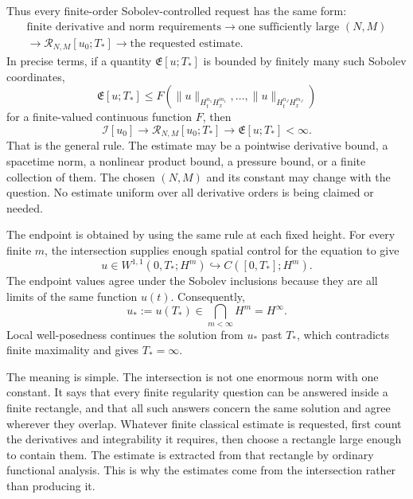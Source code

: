 Thus every finite-order Sobolev-controlled request has the same form:
\[
\boxed{
\begin{gathered}
\text{finite derivative and norm requirements}
\longrightarrow
\text{one sufficiently large }(N,M)\\
\longrightarrow
\mathcal R_{N,M}[u_0;T_*]
\longrightarrow
\text{the requested estimate}.
\end{gathered}
}
\]
In precise terms, if a quantity \(\mathfrak E[u;T_*]\) is bounded by finitely
many such Sobolev coordinates,
\[
\mathfrak E[u;T_*]
\le
F\!\left(
\|u\|_{H_t^{n_1}H_x^{m_1}},\ldots,
\|u\|_{H_t^{n_J}H_x^{m_J}}
\right)
\]
for a finite-valued continuous function \(F\), then
\[
\boxed{
\mathcal I[u_0]
\longrightarrow
\mathcal R_{N,M}[u_0;T_*]
\longrightarrow
\mathfrak E[u;T_*]<\infty.
}
\]
That is the general rule.  The estimate may be a pointwise derivative bound,
a spacetime norm, a nonlinear product bound, a pressure bound, or a finite
collection of them.  The chosen \((N,M)\) and its constant may change with the
question.  No estimate uniform over all derivative orders is being claimed or
needed.

The endpoint is obtained by using the same rule at each fixed height.  For
every finite \(m\), the intersection supplies enough spatial control for the
equation to give
\[
u\in W^{1,1}(0,T_*;H^m)
\hookrightarrow C([0,T_*];H^m).
\]
The endpoint values agree under the Sobolev inclusions because they are all
limits of the same function \(u(t)\).  Consequently,
\[
u_*:=u(T_*)\in\bigcap_{m<\infty}H^m=H^\infty.
\]
Local well-posedness continues the solution from \(u_*\) past \(T_*\), which
contradicts finite maximality and gives \(T_*=\infty\).

The meaning is simple.  The intersection is not one enormous norm with one
constant.  It says that every finite regularity question can be answered
inside a finite rectangle, and that all such answers concern the same
solution and agree wherever they overlap.  Whatever finite classical estimate
is requested, first count the derivatives and integrability it requires, then
choose a rectangle large enough to contain them.  The estimate is extracted
from that rectangle by ordinary functional analysis.  This is why the
estimates come from the intersection rather than producing it.

\endgroup
